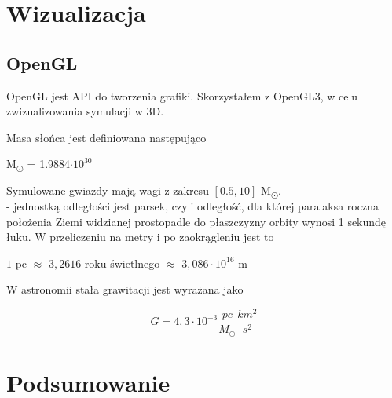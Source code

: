 \documentclass[14pt,twoside,a4paper]{article}
\begin{document}
\section{\LARGE Wizualizacja}

\subsection{\large OpenGL}
OpenGL jest API do tworzenia grafiki. Skorzystałem z OpenGL3, w celu zwizualizowania symulacji w 3D.



Masa słońca jest definiowana następująco\\
\begin{center}
M\textsubscript{\(\odot\)} = 1.9884\(\cdot 10^{30}\)\\
\end{center}
Symulowane gwiazdy mają wagi z zakresu \([0.5, 10]\) M\textsubscript{\(\odot\)}.\\
- jednostką odległości jest parsek, czyli odległość, dla której paralaksa roczna położenia Ziemi widzianej prostopadle do płaszczyzny orbity wynosi 1 sekundę łuku. W przeliczeniu na metry i po zaokrągleniu jest to 
\begin{center}
\(1\) pc \(\approx\) \(3,2616\) roku świetlnego \(\approx\) \(3,086\cdot 10^{16}\) m\\
\end{center}

W astronomii stała grawitacji jest wyrażana jako 
\begin{center}
$$G = 4,3\cdot 10^{-3} \frac{pc}{M_{\odot}} \frac{km^2}{s^2}$$
\end{center}

\newpage

\section{\LARGE Podsumowanie}

\newpage

\nocite{*}
\printbibliography
\end{document}
